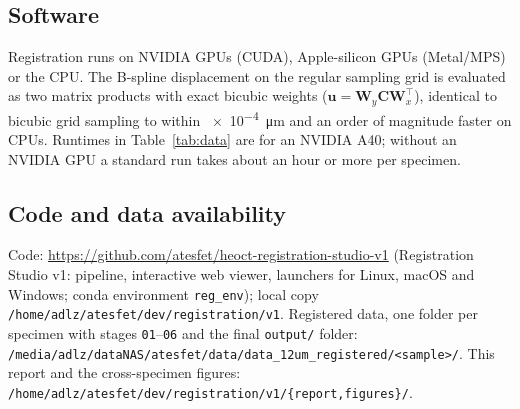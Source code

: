 \documentclass[9pt,twocolumn]{extarticle}
\begin{document}
\subsection{Software} Registration runs on NVIDIA GPUs (CUDA), Apple-silicon GPUs (Metal/MPS) or the CPU. The B-spline displacement on the regular sampling grid is evaluated as two matrix products with exact bicubic weights ($\mathbf{u}=\mathbf{W}_y\mathbf{C}\mathbf{W}_x^\top$), identical to bicubic grid sampling to within \SI{e-4}{\micro\metre} and an order of magnitude faster on CPUs. Runtimes in Table~\ref{tab:data} are for an NVIDIA A40; without an NVIDIA GPU a standard run takes about an hour or more per specimen.

\subsection{Code and data availability} {\raggedright Code: \url{https://github.com/atesfet/heoct-registration-studio-v1} (Registration Studio v1: pipeline, interactive web viewer, launchers for Linux, macOS and Windows; conda environment \texttt{reg\_env}); local copy \texttt{/home/adlz/atesfet/dev/registration/v1}. Registered data, one folder per specimen with stages \texttt{01}--\texttt{06} and the final \texttt{output/} folder: \texttt{/media/adlz/dataNAS/atesfet/data/data\_12um\_registered/<sample>/}. This report and the cross-specimen figures: \texttt{/home/adlz/atesfet/dev/registration/v1/\{report,figures\}/}.\par}
\end{document}
